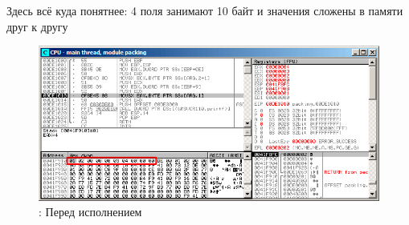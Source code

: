 Здесь всё куда понятнее: 4 поля занимают 10 байт и значения сложены в памяти друг к другу

\begin{figure}[H]
\centering
\includegraphics[scale=\FigScale]{patterns/15_structs/4_packing/olly_packing_1.png}
\caption{\olly: Перед исполнением \printf}
\label{fig:packing_olly_1}
\end{figure}
